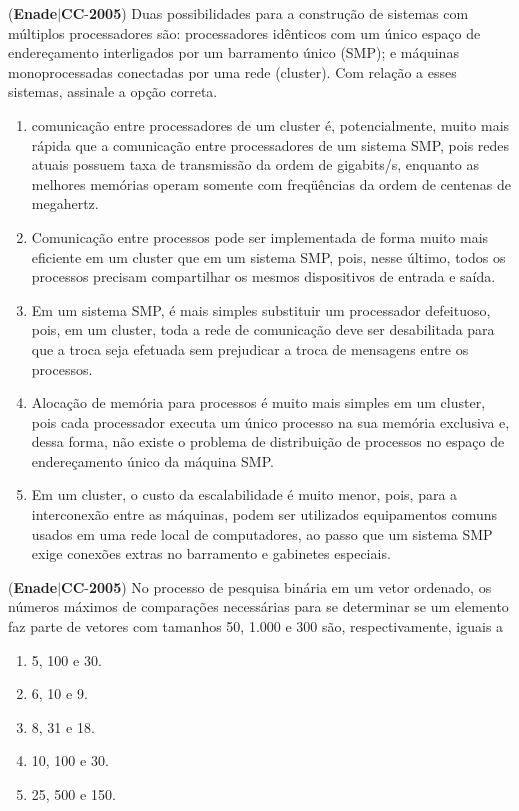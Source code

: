 \documentclass{exam}
\begin{document}
\begin{questions}
\question (\textbf{Enade}$|$\textbf{CC}-\textbf{2005}) Duas possibilidades para a construção de sistemas com múltiplos
processadores são: processadores idênticos com um único espaço de
endereçamento interligados por um barramento único (SMP); e
máquinas monoprocessadas conectadas por uma rede (cluster). Com
relação a esses sistemas, assinale a opção correta.
	\begin{enumerate}[label=\alph*)]
		\item  comunicação entre processadores de um cluster é,
potencialmente, muito mais rápida que a comunicação entre
processadores de um sistema SMP, pois redes atuais possuem
taxa de transmissão da ordem de gigabits/s, enquanto as
melhores memórias operam somente com freqüências da ordem
de centenas de megahertz.
		\item  Comunicação entre processos pode ser implementada de forma
muito mais eficiente em um cluster que em um sistema SMP,
pois, nesse último, todos os processos precisam compartilhar os
mesmos dispositivos de entrada e saída.
		\item  Em um sistema SMP, é mais simples substituir um processador
defeituoso, pois, em um cluster, toda a rede de comunicação
deve ser desabilitada para que a troca seja efetuada sem
prejudicar a troca de mensagens entre os processos.
		\item  Alocação de memória para processos é muito mais simples em
um cluster, pois cada processador executa um único processo na
sua memória exclusiva e, dessa forma, não existe o problema de
distribuição de processos no espaço de endereçamento único da
máquina SMP.
		\item  Em um cluster, o custo da escalabilidade é muito menor, pois,
para a interconexão entre as máquinas, podem ser utilizados
equipamentos comuns usados em uma rede local de
computadores, ao passo que um sistema SMP exige conexões
extras no barramento e gabinetes especiais.

	\end{enumerate}

\question (\textbf{Enade}$|$\textbf{CC}-\textbf{2005}) No processo de pesquisa binária em um vetor ordenado, os
números máximos de comparações necessárias para se
determinar se um elemento faz parte de vetores com tamanhos
50, 1.000 e 300 são, respectivamente, iguais a
	\begin{enumerate}[label=\alph*)]
		\item  5, 100 e 30.
		\item  6, 10 e 9.
		\item  8, 31 e 18.
		\item  10, 100 e 30.
		\item  25, 500 e 150.


\end{enumerate}
\end{questions}
\end{document}
